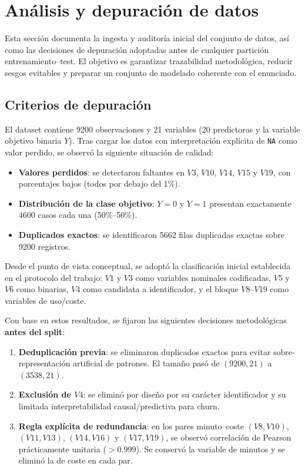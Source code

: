 \section{Análisis y depuración de datos}

Esta sección documenta la ingesta y auditoría inicial del conjunto de datos, así como las decisiones de depuración adoptadas antes de cualquier partición 
entrenamiento--test. El objetivo es garantizar trazabilidad metodológica, reducir sesgos evitables y preparar un conjunto de modelado coherente con el enunciado.

\subsection{Criterios de depuración}

El dataset contiene 9200 observaciones y 21 variables (20 predictoras y la variable objetivo binaria \(Y\)). Tras cargar los datos con interpretación explícita de \texttt{NA} como valor perdido, se observó la siguiente situación de calidad:

\begin{itemize}
	\item \textbf{Valores perdidos}: se detectaron faltantes en \(V3\), \(V10\), \(V14\), \(V15\) y \(V19\), con porcentajes bajos (todos por debajo del 1\%).
	\item \textbf{Distribución de la clase objetivo}: \(Y=0\) y \(Y=1\) presentan exactamente 4600 casos cada una (50\%--50\%).
	\item \textbf{Duplicados exactos}: se identificaron 5662 filas duplicadas exactas sobre 9200 registros.
\end{itemize}

Desde el punto de vista conceptual, se adoptó la clasificación inicial establecida en el protocolo del trabajo:
\(V1\) y \(V3\) como variables nominales codificadas, \(V5\) y \(V6\) como binarias, \(V4\) como candidata a identificador, y el bloque \(V8\)--\(V19\) como variables de uso/coste.

Con base en estos resultados, se fijaron las siguientes decisiones metodológicas \textbf{antes del split}:

\begin{enumerate}
	\item \textbf{Deduplicación previa}: se eliminaron duplicados exactos para evitar sobre-representación artificial de patrones. El tamaño pasó de \((9200, 21)\) a \((3538, 21)\).
	\item \textbf{Exclusión de \(V4\)}: se eliminó por diseño por su carácter identificador y su limitada interpretabilidad causal/predictiva para churn.
	\item \textbf{Regla explícita de redundancia}: en los pares minuto--coste \((V8,V10)\), \((V11,V13)\), \((V14,V16)\) y \((V17,V19)\), se observó correlación de Pearson prácticamente unitaria (\(>0.999\)). Se conservó la variable de minutos y se eliminó la de coste en cada par.
\end{enumerate}

